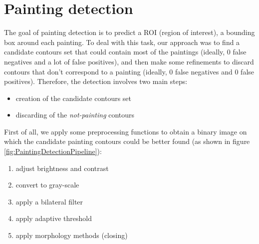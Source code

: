 \documentclass[10pt,twocolumn,letterpaper]{article}
\begin{document}
\section{Painting detection}
\label{sec:PaintingDetection}
The goal of painting detection is to predict a ROI (region of interest), \ie a bounding box around each painting.
To deal with this task, our approach was to find a candidate contours set that could contain most of the paintings (ideally, 0 false negatives and a lot of false positives), and then make some refinements to discard contours that don't correspond to a painting (ideally, 0 false negatives and 0 false positives).
Therefore, the detection involves two main steps:
\begin{itemize}
\item creation of the candidate contours set
\item discarding of the \textit{not-painting} contours
\end{itemize}

First of all, we apply some preprocessing functions to obtain a binary image on which the candidate painting contours could be better found (as shown in figure \ref{fig:PaintingDetectionPipeline}):
\begin{enumerate}
    \item adjust brightness and contrast
    \item convert to gray-scale
    \item apply a bilateral filter
    \item apply adaptive threshold
    \item apply morphology methods (closing)
\end{enumerate}
\end{document}
